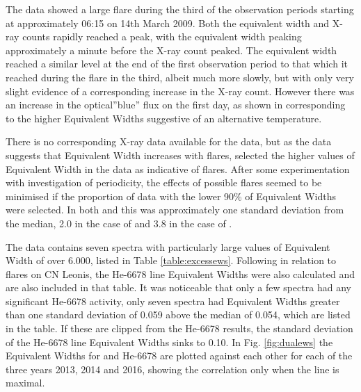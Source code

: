 The {\uves} data showed a large flare during the third of the observation periods starting at approximately 06:15 on
14th March 2009. Both the equivalent width and X-ray counts rapidly reached a peak, with the equivalent width peaking
approximately a minute before the X-ray count peaked. The equivalent width reached a similar level at the end of the
first observation period to that which it reached during the flare in the third, albeit much more slowly, but with only
very slight evidence of a corresponding increase in the X-ray count. However there was an increase in the {\uves}
optical''blue'' flux on the first day, as shown in \citet[fig. 1]{fuhrmeister11} corresponding to the higher Equivalent
Widths suggestive of an alternative temperature.

There is no corresponding X-ray data available for the {\harps} data, but as the {\uves} data suggests that {\ha}
Equivalent Width increases with flares, {\Firstp} selected the higher values of Equivalent Width in the {\harps} data as
indicative of flares. After some experimentation with investigation of periodicity, the effects of possible flares seemed to be
minimised if the proportion of data with the lower 90\% of Equivalent Widths were selected. In both {\uves} and {\harps}
this was approximately one standard deviation from the median, 2.0 in the case of {\uves} and 3.8 in the case of
{\harps}.

The {\harps} data contains seven spectra with particularly large values of Equivalent Width of over 6.000, listed in
Table \ref{table:excessews}.  Following \citet[fig. 8]{fuhrmeister08} in relation to flares on CN Leonis, the He-6678
line Equivalent Widths were also calculated and are also included in that table. It was noticeable that only a few
spectra had any significant He-6678 activity, only seven spectra had Equivalent Widths greater than one standard
deviation of 0.059 above the median of 0.054, which are listed in the table. If these are clipped from the He-6678
results, the standard deviation of the He-6678 line Equivalent Widths sinks to 0.10. In Fig. \ref{fig:dualews} the
Equivalent Widths for {\ha} and He-6678 are plotted against each other for each of the three years 2013, 2014 and
2016, showing the correlation only when the {\ha} line is maximal.

